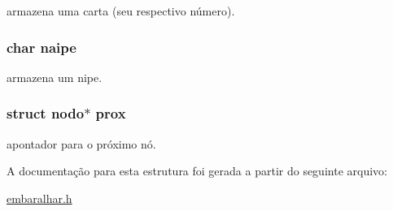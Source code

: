 armazena uma carta (seu respectivo número). 

\hypertarget{structnodo_aba763958bee1abb2961d0d2e82f8cdfb}{
\subsubsection[{naipe}]{\setlength{\rightskip}{0pt plus 5cm}char {\bf naipe}}}
\label{structnodo_aba763958bee1abb2961d0d2e82f8cdfb}


armazena um nipe. 

\hypertarget{structnodo_a486ad5c9b955ff42eaf8fbf3330e4c75}{
\subsubsection[{prox}]{\setlength{\rightskip}{0pt plus 5cm}struct {\bf nodo}$\ast$ {\bf prox}}}
\label{structnodo_a486ad5c9b955ff42eaf8fbf3330e4c75}


apontador para o próximo nó. 



A documentação para esta estrutura foi gerada a partir do seguinte arquivo:\begin{DoxyCompactItemize}
\item 
\hyperlink{embaralhar_8h}{embaralhar.h}\end{DoxyCompactItemize}
